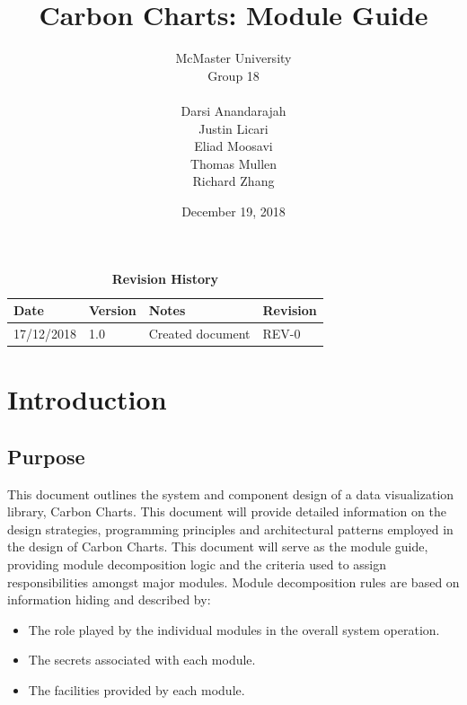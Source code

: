 \documentclass[12pt, titlepage]{article}
\title{Carbon Charts: Module Guide\\}
\author{
    McMaster University\\
    Group 18 \\ \\
    Darsi Anandarajah \\
    Justin Licari \\
    Eliad Moosavi \\
    Thomas Mullen \\
    Richard Zhang \\
}
\date{December 19, 2018}
\begin{document}
\maketitle

\tableofcontents
\listoftables
\listoffigures
\begin{table}[bp]
\caption{\bf Revision History}
\begin{tabularx}{\textwidth}{p{3cm}p{2cm}p{4cm}p{3cm}}
\toprule {\bf Date} & {\bf Version} & {\bf Notes} & {\bf Revision}\\
\midrule
17/12/2018 & 1.0  & Created document &  REV-0 \\

\bottomrule
\end{tabularx}
\end{table}

\newpage


\section{Introduction}

\subsection{Purpose}
This document outlines the system and component design of a data visualization library, Carbon Charts. This document will provide detailed information on the design strategies, programming principles and architectural patterns employed in the design of Carbon Charts. This document will serve as the module guide, providing module decomposition logic and the criteria used to assign responsibilities amongst major modules. Module decomposition rules are based on information hiding and described by:
\begin{itemize}
    \item The role played by the individual modules in the overall system operation.
    \item The secrets associated with each module.
    \item The facilities provided by each module. 
\end{itemize}
\end{document}
